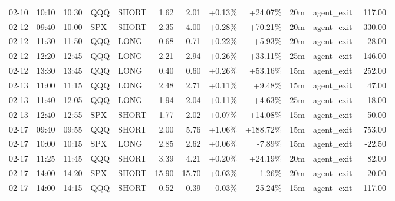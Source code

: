 \documentclass[11pt,a4paper]{article}
\begin{document}
\begin{center}
\begin{longtable}{>{\color{txtmain}}l l l l l r r r r r >{\color{txtmain}}l r}
02-10 & 10:10 & 10:30 & QQQ & SHORT & 1.62 & 2.01 & \textcolor{wingreen}{+0.13\%} & \textcolor{wingreen}{+24.07\%} & 20m & agent\_exit & \textcolor{wingreen}{117.00} \\
02-12 & 09:40 & 10:00 & SPX & SHORT & 2.35 & 4.00 & \textcolor{wingreen}{+0.28\%} & \textcolor{wingreen}{+70.21\%} & 20m & agent\_exit & \textcolor{wingreen}{330.00} \\
02-12 & 11:30 & 11:50 & QQQ & LONG & 0.68 & 0.71 & \textcolor{wingreen}{+0.22\%} & \textcolor{wingreen}{+5.93\%} & 20m & agent\_exit & \textcolor{wingreen}{28.00} \\
02-12 & 12:20 & 12:45 & QQQ & LONG & 2.21 & 2.94 & \textcolor{wingreen}{+0.26\%} & \textcolor{wingreen}{+33.11\%} & 25m & agent\_exit & \textcolor{wingreen}{146.00} \\
02-12 & 13:30 & 13:45 & QQQ & LONG & 0.40 & 0.60 & \textcolor{wingreen}{+0.26\%} & \textcolor{wingreen}{+53.16\%} & 15m & agent\_exit & \textcolor{wingreen}{252.00} \\
02-13 & 11:00 & 11:15 & QQQ & LONG & 2.48 & 2.71 & \textcolor{wingreen}{+0.11\%} & \textcolor{wingreen}{+9.48\%} & 15m & agent\_exit & \textcolor{wingreen}{47.00} \\
02-13 & 11:40 & 12:05 & QQQ & LONG & 1.94 & 2.04 & \textcolor{wingreen}{+0.11\%} & \textcolor{wingreen}{+4.63\%} & 25m & agent\_exit & \textcolor{wingreen}{18.00} \\
02-13 & 12:40 & 12:55 & SPX & SHORT & 1.77 & 2.02 & \textcolor{wingreen}{+0.07\%} & \textcolor{wingreen}{+14.08\%} & 15m & agent\_exit & \textcolor{wingreen}{50.00} \\
02-17 & 09:40 & 09:55 & QQQ & SHORT & 2.00 & 5.76 & \textcolor{wingreen}{+1.06\%} & \textcolor{wingreen}{+188.72\%} & 15m & agent\_exit & \textcolor{wingreen}{753.00} \\
02-17 & 10:00 & 10:15 & SPX & LONG & 2.85 & 2.62 & \textcolor{wingreen}{+0.06\%} & \textcolor{lossred}{-7.89\%} & 15m & agent\_exit & \textcolor{lossred}{-22.50} \\
02-17 & 11:25 & 11:45 & QQQ & SHORT & 3.39 & 4.21 & \textcolor{wingreen}{+0.20\%} & \textcolor{wingreen}{+24.19\%} & 20m & agent\_exit & \textcolor{wingreen}{82.00} \\
02-17 & 14:00 & 14:20 & SPX & SHORT & 15.90 & 15.70 & \textcolor{wingreen}{+0.03\%} & \textcolor{lossred}{-1.26\%} & 20m & agent\_exit & \textcolor{lossred}{-20.00} \\
02-17 & 14:00 & 14:15 & QQQ & SHORT & 0.52 & 0.39 & \textcolor{lossred}{-0.03\%} & \textcolor{lossred}{-25.24\%} & 15m & agent\_exit & \textcolor{lossred}{-117.00} \\

\end{longtable}
\end{center}
\end{document}
